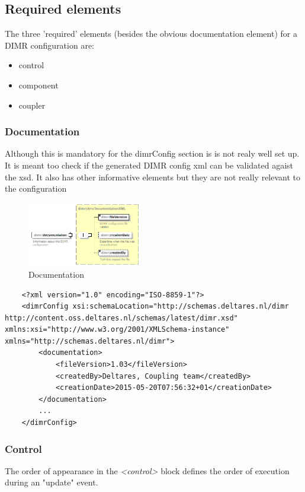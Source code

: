 \documentclass[signature]{deltares_manual}
\newcommand{\dimr}{\textrm{DIMR}\xspace}
\begin{document}
\subsection{Required elements}
\label{subsec:dimrRequiredxsd}
The three 'required' elements (besides the obvious documentation element) for a \dimr configuration are:
\begin{itemize}
	\item control
	\item component
	\item coupler
\end{itemize}
\subsubsection{Documentation}
Although this is mandatory for the dimrConfig section is is not realy well set up. It is meant too check if the generated \dimr config xml can be validated agaist the xsd. It also has other informative elements but they are not really relevant to the configuration

\begin{figure}[H]
	\centering
	\includegraphics[width=0.45\textwidth] {pictures/dimr_diagrams/dimr_p44.png}
	\caption{Documentation} 
	\label{fig:dimrDocumentation}
\end{figure}
\begin{lstlisting}
 	<?xml version="1.0" encoding="ISO-8859-1"?>
 	<dimrConfig xsi:schemaLocation="http://schemas.deltares.nl/dimr http://content.oss.deltares.nl/schemas/latest/dimr.xsd" xmlns:xsi="http://www.w3.org/2001/XMLSchema-instance" xmlns="http://schemas.deltares.nl/dimr">
 		<documentation>
 			<fileVersion>1.03</fileVersion>
		 	<createdBy>Deltares, Coupling team</createdBy>
	 		<creationDate>2015-05-20T07:56:32+01</creationDate>
 		</documentation>
	 	...
 	</dimrConfig>
\end{lstlisting}
 
\subsubsection{Control}

\Note The order of appearance in the \textit{<control>} block defines the order of execution during an "update" event.
\end{document}
